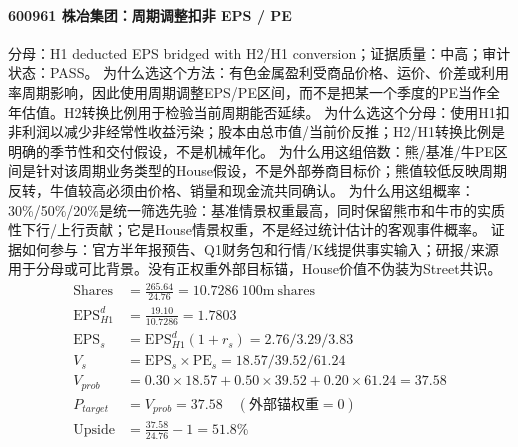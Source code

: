 \paragraph{600961 株冶集团：周期调整扣非 EPS / PE}
分母：H1 deducted EPS bridged with H2/H1 conversion；证据质量：中高；审计状态：PASS。
为什么选这个方法：有色金属盈利受商品价格、运价、价差或利用率周期影响，因此使用周期调整EPS/PE区间，而不是把某一个季度的PE当作全年估值。H2转换比例用于检验当前周期能否延续。
为什么选这个分母：使用H1扣非利润以减少非经常性收益污染；股本由总市值/当前价反推；H2/H1转换比例是明确的季节性和交付假设，不是机械年化。
为什么用这组倍数：熊/基准/牛PE区间是针对该周期业务类型的House假设，不是外部券商目标价；熊值较低反映周期反转，牛值较高必须由价格、销量和现金流共同确认。
为什么用这组概率：30\%/50\%/20\%是统一筛选先验：基准情景权重最高，同时保留熊市和牛市的实质性下行/上行贡献；它是House情景权重，不是经过统计估计的客观事件概率。
证据如何参与：官方半年报预告、Q1财务包和行情/K线提供事实输入；研报/来源用于分母或可比背景。没有正权重外部目标锚，House价值不伪装为Street共识。
\begin{align*}
\mathrm{Shares} &= \frac{265.64}{24.76}=10.7286\ \mathrm{100m\ shares}\\
\mathrm{EPS}_{H1}^d &= \frac{19.10}{10.7286}=1.7803\\
\mathrm{EPS}_s &= \mathrm{EPS}_{H1}^d(1+r_s)=2.76/3.29/3.83\\
V_s &= \mathrm{EPS}_s\times \mathrm{PE}_s=18.57/39.52/61.24\\
V_{prob} &= 0.30\times 18.57+0.50\times 39.52+0.20\times 61.24=37.58\\
P_{target} &= V_{prob}=37.58\quad(\text{外部锚权重}=0)\\
\mathrm{Upside} &= \frac{37.58}{24.76}-1=51.8\%\\
\end{align*}

